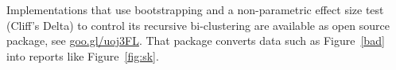 \documentclass[10pt]{elsarticle}
\begin{document}
 
Implementations that use bootstrapping and a non-parametric effect size test (Cliff's Delta) to control its recursive bi-clustering are available as open source package, see \href{https://goo.gl/uoj3FL}{goo.gl/uoj3FL}.  
 That package converts data such as Figure~\ref{bad} into reports like Figure~\ref{fig:sk}. 
 



 
\end{document}
